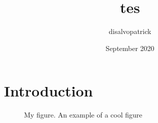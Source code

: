 \documentclass{article}
\title{tes}
\author{disalvopatrick }
\date{September 2020}
\begin{document}
\maketitle

\section{Introduction}

    \begin{figure}[!htb]
        \caption{My figure.  An example of a cool figure}
        \label{Fig:aa}
    \end{figure}
\end{document}
